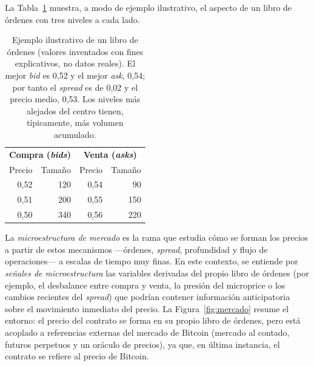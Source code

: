 La Tabla~\ref{tab:lob} muestra, a modo de ejemplo ilustrativo, el aspecto de un libro de
órdenes con tres niveles a cada lado.

\begin{table}[h]
\centering
\caption{Ejemplo ilustrativo de un libro de órdenes (valores inventados con fines
explicativos, no datos reales). El mejor \emph{bid} es 0,52 y el mejor \emph{ask}, 0,54; por
tanto el \emph{spread} es de 0,02 y el precio medio, 0,53. Los niveles más alejados del
centro tienen, típicamente, más volumen acumulado.}
\label{tab:lob}
\begin{tabular}{rr|rr}
\toprule
\multicolumn{2}{c|}{\textbf{Compra (\emph{bids})}} & \multicolumn{2}{c}{\textbf{Venta (\emph{asks})}} \\
Precio & Tamaño & Precio & Tamaño \\
\midrule
0,52 & 120 & 0,54 & \phantom{0}90 \\
0,51 & 200 & 0,55 & 150 \\
0,50 & 340 & 0,56 & 220 \\
\bottomrule
\end{tabular}
\end{table}

La \emph{microestructura de mercado} es la rama que estudia cómo se forman los precios a
partir de estos mecanismos —órdenes, \emph{spread}, profundidad y flujo de
operaciones— a escalas de tiempo muy finas. En este contexto, se entiende por
\emph{señales de microestructura} las variables derivadas del propio libro de órdenes (por
ejemplo, el desbalance entre compra y venta, la presión del microprice o los cambios
recientes del \emph{spread}) que podrían contener información anticipatoria sobre el
movimiento inmediato del precio. La Figura~\ref{fig:mercado} resume el entorno: el precio del
contrato se forma en su propio libro de órdenes, pero está acoplado a referencias externas
del mercado de Bitcoin (mercado al contado, futuros perpetuos y un oráculo de precios), ya
que, en última instancia, el contrato se refiere al precio de Bitcoin.

